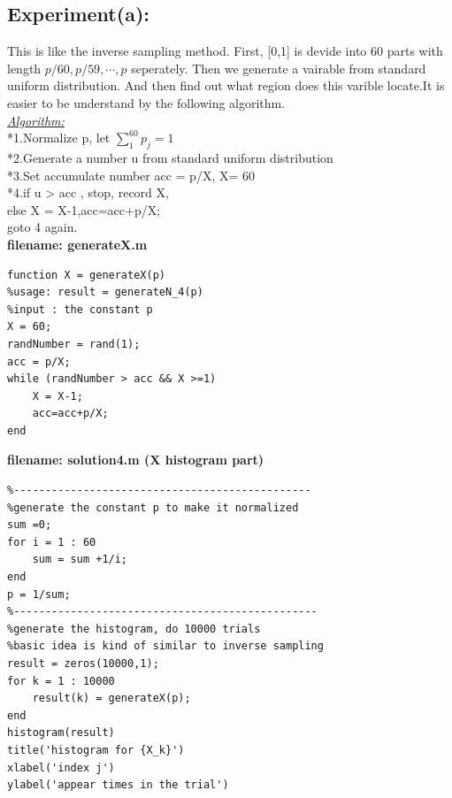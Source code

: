 \documentclass[twoside]{article}
\begin{document}
\subsection{\normalsize{Experiment(a):}}
This is like the inverse sampling method. First, [0,1] is devide into 60 parts with length $p/60,p/59,\cdots,p$ seperately. Then we generate a vairable from standard uniform distribution. And then find out what region does this varible locate.It is easier to be understand by the following algorithm.\\[10pt]
\underline{\emph{Algorithm:}}\\[10pt]
*1.Normalize p, let $\displaystyle\sum_{1}^{60}p_j=1$\\
*2.Generate a number u from standard uniform distribution\\
*3.Set accumulate number acc = p/X, X= 60\\
*4.if u > acc , stop, record X, \\
  else X = X-1,acc=acc+p/X; \\
  goto 4 again.\\
\noindent \textbf {filename: generateX.m}\\
\begin{lstlisting}
function X = generateX(p)
%usage: result = generateN_4(p)
%input : the constant p
X = 60;
randNumber = rand(1);
acc = p/X;
while (randNumber > acc && X >=1)
    X = X-1;
    acc=acc+p/X;
end
\end{lstlisting}
\noindent \textbf {filename: solution4.m (X histogram part) }
\begin{lstlisting}
%-----------------------------------------------
%generate the constant p to make it normalized
sum =0;
for i = 1 : 60 
    sum = sum +1/i;
end
p = 1/sum;
%------------------------------------------------
%generate the histogram, do 10000 trials
%basic idea is kind of similar to inverse sampling
result = zeros(10000,1);
for k = 1 : 10000
    result(k) = generateX(p);
end
histogram(result)
title('histogram for {X_k}')
xlabel('index j')
ylabel('appear times in the trial')
\end{lstlisting}
\end{document}
